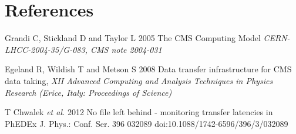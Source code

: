 \section*{References}

\begin{thebibliography}{1}

  Grandi C, Stickland D and Taylor L 2005 The CMS Computing Model {\it CERN-LHCC-2004-35/G-083, CMS note 2004-031}

  Egeland R, Wildish T and Metson S 2008 Data transfer infrastructure for CMS data taking,  {\it XII Advanced Computing and Analysis Techniques in Physics Research (Erice, Italy: Proceedings of Science)}
  
 T Chwalek {\it et al.} 2012 No file left behind - monitoring transfer latencies in PhEDEx J. Phys.: Conf. Ser. 396 032089 doi:10.1088/1742-6596/396/3/032089

\end{thebibliography}
